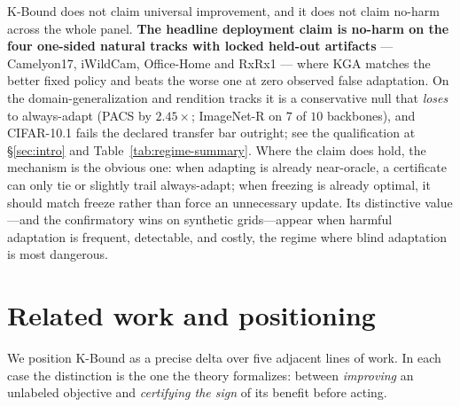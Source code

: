 \documentclass[conference]{IEEEtran}
\theoremstyle{plain}
\theoremstyle{definition}
\begin{document}
K-Bound does not claim universal improvement, and it does not claim no-harm across the whole panel.
\textbf{The headline deployment claim is no-harm on the four one-sided natural tracks with locked
held-out artifacts} --- Camelyon17, iWildCam, Office-Home and RxRx1 --- where \textsc{KGA} matches
the better fixed policy and beats the worse one at zero observed false adaptation. On the
domain-generalization and rendition tracks it is a conservative null that \emph{loses} to
always-adapt (PACS by $2.45\times$; ImageNet-R on $7$ of $10$ backbones), and CIFAR-10.1 fails the
declared transfer bar outright; see the qualification at \S\ref{sec:intro} and
Table~\ref{tab:regime-summary}. Where the claim does hold, the mechanism is the obvious one: when
adapting is already near-oracle, a certificate can only tie or slightly trail always-adapt; when
freezing is already optimal, it should match freeze rather than force an unnecessary update. Its distinctive value---and the confirmatory wins on synthetic
grids---appear when harmful adaptation is frequent, detectable, and costly, the regime where blind
adaptation is most dangerous.



\section{Related work and positioning}
We position K-Bound as a precise delta over five adjacent lines of work. In each case the
distinction is the one the theory formalizes: between \emph{improving} an unlabeled objective
and \emph{certifying the sign} of its benefit before acting.
\end{document}
